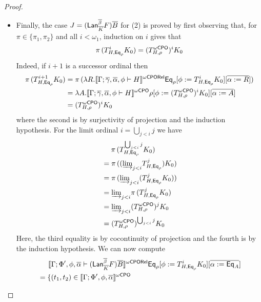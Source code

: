 \documentclass[acmsmall,review,anonymous]{acmart}
\theoremstyle{definition}
\begin{document}
\begin{proof}
\begin{itemize}
\begin{itemize}
\item {\color{blue} Finally, the case $J = (\mathsf{Lan}_{\overline{K}}^{\overline{\beta}}
  F)\overline{B}$ for (2) is proved by first observing that, for $\pi \in
  \{\pi_1,\pi_2\}$ and all $i < \omega_1$, induction on $i$ gives that
\begin{equation}\label{eq:helper-lan}
\pi\, (T^i_{H,\mathsf{Eq}_{\rho}} K_0) = (T^{\omega\mathsf{CPO}}_{H,\rho})^i K_0 
\end{equation}
Indeed, if $i+1$ is a successor ordinal then
\begin{align*}
\pi\, (T^{i+1}_{H,\mathsf{Eq}_{\rho}} K_0) &= \pi\,(\lambda R. \llbracket{\Gamma;\overline{\gamma}, \overline{\alpha}, \phi \vdash H}\rrbracket^{{\omega\mathsf{CPORel}}}\mathsf{Eq}_\rho[\phi :=
  T^{i}_{H,\mathsf{Eq}_{\rho}} K_0][\overline{\alpha := R}])\\
&= \lambda A. \llbracket{\Gamma;\overline{\gamma}, \overline{\alpha}, \phi \vdash H}\rrbracket^{{\omega\mathsf{CPO}}}\rho[\phi :=
   (T^{{\omega\mathsf{CPO}}}_{H,\rho})^i K_0][\overline{\alpha := A}]\\
&= (T^{\omega\mathsf{CPO}}_{H,\rho})^i K_0 
\end{align*}
where the second is by surjectivity of projection and the induction
hypothesis. For the limit ordinal $i = \bigcup_{j<i}j$ we have
\begin{align*}
& \hspace*{0.18in} \pi\, (T^{\bigcup_{j<i}j}_{H,\mathsf{Eq}_{\rho}} K_0)\\
&= \pi\, (({{\underrightarrow{\lim}}_{j < i}{T^j_{H,\mathsf{Eq}_{\rho}}}})K_0)\\
&= \pi\, ({{\underrightarrow{\lim}}_{j < i}{(T^j_{H,\mathsf{Eq}_{\rho}} K_0)}})\\
&= {{\underrightarrow{\lim}}_{j < i}{\pi\,(T^j_{H,\mathsf{Eq}_{\rho}} K_0)}}\\
&= {{\underrightarrow{\lim}}_{j < i}{(T^{\omega\mathsf{CPO}}_{H,\rho})^j K_0 }}\\
&= (T^{\omega\mathsf{CPO}}_{H,\rho})^{\bigcup_{j<i}j} K_0\\
\end{align*}
Here, the third equality is by cocontinuity of projection and the
fourth is by the induction hypothesis. 
We can now compute 
\begin{align*}
&\hspace*{0.2in}\llbracket{\Gamma;\Phi',\phi,\overline{\alpha}
    \vdash (\mathsf{Lan}_{\overline{K}}^{\overline{\beta}} F)\overline{B}}\rrbracket^{{\omega\mathsf{CPORel}}}  \mathsf{Eq}_{\rho} [\phi :=
    T^i_{H,\mathsf{Eq}_{\rho}} K_0] [\overline{\alpha := \mathsf{Eq}_A}]\\
&= \{(t_1,t_2) \in \llbracket{\Gamma;\Phi',\phi,\overline{\alpha}
}\rrbracket^{{\omega\mathsf{CPO}}}
\end{align*}}
\end{itemize}
\end{itemize}
\end{proof}
\end{document}
